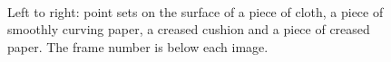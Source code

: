 \begin{figure}[!t]
\begin{minipage}[b]{0.2\textwidth}
        \end{minipage}\\%
        \addtocounter{subfigure}{-1}
        \caption{Left to right: point sets on the surface of a piece of cloth, a piece of smoothly curving paper, a creased cushion and a piece of creased paper. The frame number is below each image. }
\label{fig:mini:subfig_deformableimages} %
\end{figure}%
